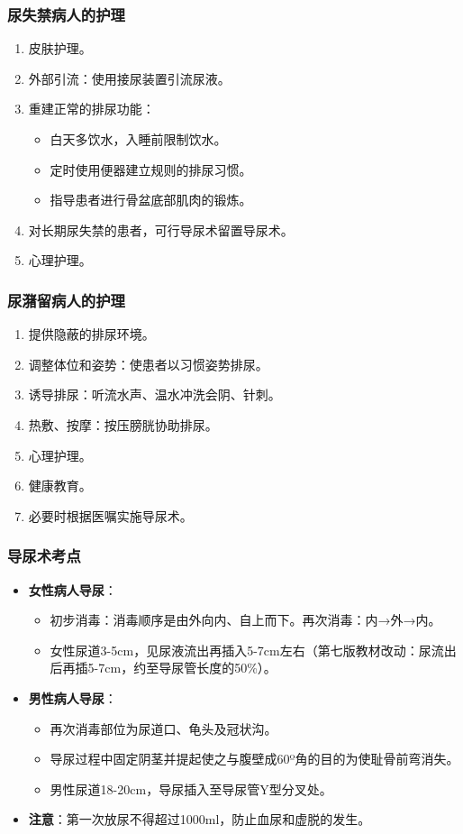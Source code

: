 \documentclass[11pt, a4paper]{ctexart}
\begin{document}
\subsubsection{尿失禁病人的护理}
\begin{enumerate}
    \item 皮肤护理。
    \item 外部引流：使用接尿装置引流尿液。
    \item 重建正常的排尿功能：
    \begin{itemize}
        \item 白天多饮水，入睡前限制饮水。
        \item 定时使用便器建立规则的排尿习惯。
        \item 指导患者进行骨盆底部肌肉的锻炼。
    \end{itemize}
    \item 对长期尿失禁的患者，可行导尿术留置导尿术。
    \item 心理护理。
\end{enumerate}

\subsubsection{尿潴留病人的护理}
\begin{enumerate}
    \item 提供隐蔽的排尿环境。
    \item 调整体位和姿势：使患者以习惯姿势排尿。
    \item 诱导排尿：听流水声、温水冲洗会阴、针刺。
    \item 热敷、按摩：按压膀胱协助排尿。
    \item 心理护理。
    \item 健康教育。
    \item 必要时根据医嘱实施导尿术。
\end{enumerate}

\subsubsection{导尿术考点}
\begin{itemize}
    \item \textbf{女性病人导尿}：
    \begin{itemize}
        \item 初步消毒：消毒顺序是由外向内、自上而下。再次消毒：内→外→内。
        \item 女性尿道3-5cm，见尿液流出再插入5-7cm左右（第七版教材改动：尿流出后再插5-7cm，约至导尿管长度的50\%）。
    \end{itemize}
    \item \textbf{男性病人导尿}：
    \begin{itemize}
        \item 再次消毒部位为尿道口、龟头及冠状沟。
        \item 导尿过程中固定阴茎并提起使之与腹壁成60º角的目的为使耻骨前弯消失。
        \item 男性尿道18-20cm，导尿插入至导尿管Y型分叉处。
    \end{itemize}
    \item \textbf{注意}：第一次放尿不得超过1000ml，防止血尿和虚脱的发生。
\end{itemize}
\end{document}
